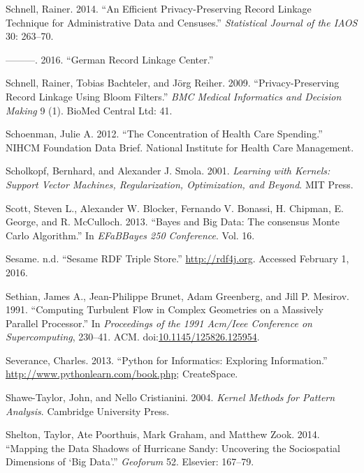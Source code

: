 \documentclass[]{krantz}
\begin{document}
\hypertarget{ref-schnell2014efficient}{}
Schnell, Rainer. 2014. ``An Efficient Privacy-Preserving Record Linkage
Technique for Administrative Data and Censuses.'' \emph{Statistical
Journal of the IAOS} 30: 263--70.

\hypertarget{ref-Schnell2016}{}
---------. 2016. ``German Record Linkage Center.''

\hypertarget{ref-schnell2009privacy}{}
Schnell, Rainer, Tobias Bachteler, and Jörg Reiher. 2009.
``Privacy-Preserving Record Linkage Using Bloom Filters.'' \emph{BMC
Medical Informatics and Decision Making} 9 (1). BioMed Central Ltd: 41.

\hypertarget{ref-healthcarespending}{}
Schoenman, Julie A. 2012. ``The Concentration of Health Care Spending.''
NIHCM Foundation Data Brief. National Institute for Health Care
Management.

\hypertarget{ref-Scholkopf2001}{}
Scholkopf, Bernhard, and Alexander J. Smola. 2001. \emph{Learning with
Kernels: Support Vector Machines, Regularization, Optimization, and
Beyond}. MIT Press.

\hypertarget{ref-scott2013bayes}{}
Scott, Steven L., Alexander W. Blocker, Fernando V. Bonassi, H. Chipman,
E. George, and R. McCulloch. 2013. ``Bayes and Big Data: The consensus
Monte Carlo Algorithm.'' In \emph{EFaBBayes 250 Conference}. Vol. 16.

\hypertarget{ref-sesame}{}
Sesame. n.d. ``Sesame RDF Triple Store.'' \url{http://rdf4j.org}.
Accessed February 1, 2016.

\hypertarget{ref-bigdata_old1}{}
Sethian, James A., Jean-Philippe Brunet, Adam Greenberg, and Jill P.
Mesirov. 1991. ``Computing Turbulent Flow in Complex Geometries on a
Massively Parallel Processor.'' In \emph{Proceedings of the 1991
Acm/Ieee Conference on Supercomputing}, 230--41. ACM.
doi:\href{https://doi.org/10.1145/125826.125954}{10.1145/125826.125954}.

\hypertarget{ref-SeverancePython}{}
Severance, Charles. 2013. ``Python for Informatics: Exploring
Information.'' \url{http://www.pythonlearn.com/book.php}; CreateSpace.

\hypertarget{ref-ShaweTaylor2004}{}
Shawe-Taylor, John, and Nello Cristianini. 2004. \emph{Kernel Methods
for Pattern Analysis}. Cambridge University Press.

\hypertarget{ref-shelton2014mapping}{}
Shelton, Taylor, Ate Poorthuis, Mark Graham, and Matthew Zook. 2014.
``Mapping the Data Shadows of Hurricane Sandy: Uncovering the
Sociospatial Dimensions of `Big Data'.'' \emph{Geoforum} 52. Elsevier:
167--79.
\end{document}
